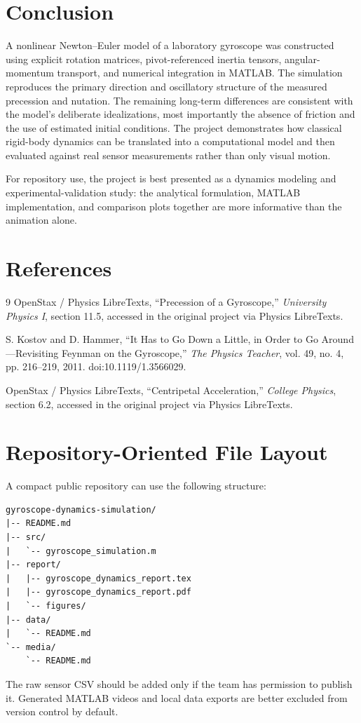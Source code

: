 \documentclass[11pt]{article}
\begin{document}
\section{Conclusion}
A nonlinear Newton--Euler model of a laboratory gyroscope was constructed using explicit rotation matrices, pivot-referenced inertia tensors, angular-momentum transport, and numerical integration in MATLAB. The simulation reproduces the primary direction and oscillatory structure of the measured precession and nutation. The remaining long-term differences are consistent with the model's deliberate idealizations, most importantly the absence of friction and the use of estimated initial conditions. The project demonstrates how classical rigid-body dynamics can be translated into a computational model and then evaluated against real sensor measurements rather than only visual motion.

For repository use, the project is best presented as a dynamics modeling and experimental-validation study: the analytical formulation, MATLAB implementation, and comparison plots together are more informative than the animation alone.

\section*{References}
\begin{thebibliography}{9}
OpenStax / Physics LibreTexts, ``Precession of a Gyroscope,'' \textit{University Physics I}, section 11.5, accessed in the original project via Physics LibreTexts.

S. Kostov and D. Hammer, ``It Has to Go Down a Little, in Order to Go Around---Revisiting Feynman on the Gyroscope,'' \textit{The Physics Teacher}, vol. 49, no. 4, pp. 216--219, 2011. doi:10.1119/1.3566029.

OpenStax / Physics LibreTexts, ``Centripetal Acceleration,'' \textit{College Physics}, section 6.2, accessed in the original project via Physics LibreTexts.
\end{thebibliography}

\appendix
\section{Repository-Oriented File Layout}
A compact public repository can use the following structure:
\begin{lstlisting}
gyroscope-dynamics-simulation/
|-- README.md
|-- src/
|   `-- gyroscope_simulation.m
|-- report/
|   |-- gyroscope_dynamics_report.tex
|   |-- gyroscope_dynamics_report.pdf
|   `-- figures/
|-- data/
|   `-- README.md
`-- media/
    `-- README.md
\end{lstlisting}
The raw sensor CSV should be added only if the team has permission to publish it. Generated MATLAB videos and local data exports are better excluded from version control by default.
\end{document}
